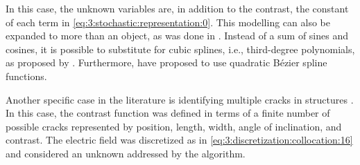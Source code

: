 			In this case, the unknown variables are, in addition to the contrast, the constant of each term in \eqref{eq:3:stochastic:representation:0}. This modelling can also be expanded to more than an object, as was done in \citep{qing2001electromagnetic,qing2006dynamic}. Instead of a sum of sines and cosines, it is possible to substitute for cubic splines, i.e., third-degree polynomials, as proposed by \cite{huang2008time}. Furthermore, \cite{salucci2022learned} have proposed to use quadratic Bézier spline functions.
			
			Another specific case in the literature is identifying multiple cracks in structures \citep{benedetti2007multicrack}. In this case, the contrast function was defined in terms of a finite number of possible cracks represented by position, length, width, angle of inclination, and contrast. The electric field was discretized as in \eqref{eq:3:discretization:collocation:16} and considered an unknown addressed by the algorithm.
			
